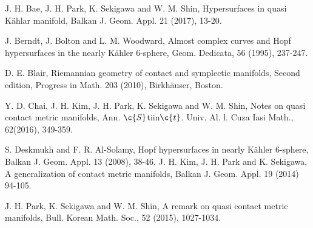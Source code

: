 \documentclass[12pt]{article}
\def\red{\color{red}}
\numberwithin{equation}{section}
\begin{document}
\begin{thebibliography}{20}
\def\refprep#1#2{#1, {\em #2,} preprint.}
\def\refnot#1#2#3{#1, #2, {\em #3},\ to appear.}
\def\refart#1#2#3#4{#1, #2, {\em #3\/} #4.}
\def\refbook#1#2#3{#1, {\em #2,\/} #3.}

J. H. Bae, J. H. Park, K. Sekigawa and W. M. Shin, Hypersurfaces in quasi K\"ahlar manifold,
Balkan J. Geom. Appl. 21 (2017), 13-20.


 J. Berndt, J. Bolton and L. M. Woodward, Almost
complex curves and Hopf hypersurfaces in the nearly {K\"ahler}
6-sphere, Geom. Dedicata, 56 (1995), 237-247.


D. E. Blair, Riemannian geometry of contact and symplectic
manifolds, Second edition, Progress in Math. 203 (2010),
Birkh\"auser, Boston.


 Y. D. Chai, J. H. Kim, J. H. Park, K. Sekigawa and
W. M. Shin, Notes on quasi contact metric manifolds, Ann. $\c{S}$tiin$\c{t}$.
Univ. Al. l. Cuza Iasi Math.,
62(2016), 349-359.%


 S. Deskmukh and F. R. Al-Solamy, Hopf hypersurfaces in
nearly K\"ahler 6-sphere, Balkan J. Geom. Appl. 13 (2008), 38-46.
%
 J. H. Kim, J. H. Park and K. Sekigawa, A generalization of contact metric manifolds,
Balkan J. Geom. Appl. 19 (2014) 94-105.


 J. H. Park, K. Sekigawa and W. M. Shin, A remark on
quasi contact metric manifolds, Bull. Korean Math. Soc., 52 (2015),
1027-1034.


\end{thebibliography}
\end{document}
